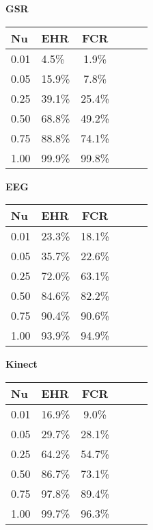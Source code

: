 \begin{table}[h]
  \centering
  \textbf{GSR}\vspace{2pt}
  \begin{tabularx}{\columnwidth}{XXcXXc}
    \toprule
    \textbf{Nu} & \textbf{EHR} & \textbf{FCR} \\
    \midrule
    0.01        & 4.5\%        & 1.9\%        \\ \hline
    0.05        & 15.9\%       & 7.8\%        \\ \hline
    0.25        & 39.1\%       & 25.4\%       \\ \hline
    0.50        & 68.8\%       & 49.2\%       \\ \hline
    0.75        & 88.8\%       & 74.1\%       \\ \hline
    1.00        & 99.9\%       & 99.8\%       \\ \hline
    \bottomrule
  \end{tabularx}

  \vspace{4pt}

  \textbf{EEG}\vspace{2pt}
  \begin{tabularx}{\columnwidth}{XXcXXc}
    \toprule
    \textbf{Nu} & \textbf{EHR} & \textbf{FCR} \\
    \midrule
    0.01        & 23.3\%       & 18.1\%       \\ \hline
    0.05        & 35.7\%       & 22.6\%       \\ \hline
    0.25        & 72.0\%       & 63.1\%       \\ \hline
    0.50        & 84.6\%       & 82.2\%       \\ \hline
    0.75        & 90.4\%       & 90.6\%       \\ \hline
    1.00        & 93.9\%       & 94.9\%       \\ \hline
    \bottomrule
  \end{tabularx}

  \vspace{4pt}

  \textbf{Kinect}\vspace{2pt}
  \begin{tabularx}{\columnwidth}{XXcXXc}
    \toprule
    \textbf{Nu} & \textbf{EHR} & \textbf{FCR} \\
    \midrule
    0.01        & 16.9\%       & 9.0\%        \\ \hline
    0.05        & 29.7\%       & 28.1\%       \\ \hline
    0.25        & 64.2\%       & 54.7\%       \\ \hline
    0.50        & 86.7\%       & 73.1\%       \\ \hline
    0.75        & 97.8\%       & 89.4\%       \\ \hline
    1.00        & 99.7\%       & 96.3\%       \\ \hline
    \bottomrule
  \end{tabularx}


\end{table}
